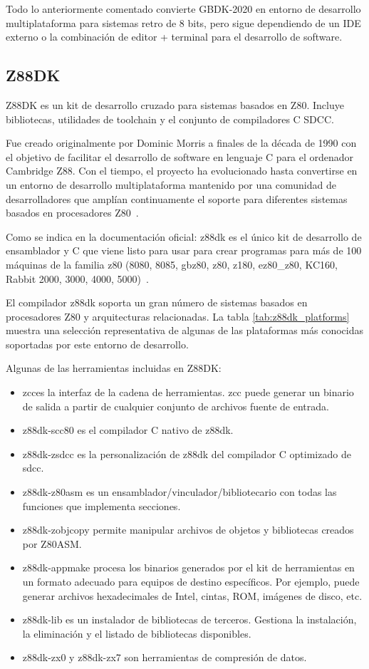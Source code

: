 \documentclass[../../main.tex]{subfiles}
\begin{document}
Todo lo anteriormente comentado convierte GBDK-2020 en entorno de desarrollo multiplataforma para sistemas retro de 8 bits, pero sigue dependiendo de un IDE externo o la combinación de editor + terminal para el desarrollo de software.

\clearpage
\subsection{Z88DK}
Z88DK es un kit de desarrollo cruzado para sistemas basados en Z80. Incluye bibliotecas, utilidades de toolchain y el conjunto de compiladores C SDCC.

Fue creado originalmente por Dominic Morris a finales de la década de 1990 con el objetivo de facilitar el desarrollo de software en lenguaje C para el ordenador Cambridge Z88. Con el tiempo, el proyecto ha evolucionado hasta convertirse en un entorno de desarrollo multiplataforma mantenido por una comunidad de desarrolladores que amplían continuamente el soporte para diferentes sistemas basados en procesadores Z80~\cite{z88dk}.

Como se indica en la documentación oficial: z88dk es el único kit de desarrollo de ensamblador y C que viene listo para usar para crear programas para más de 100 máquinas de la familia z80 (8080, 8085, gbz80, z80, z180, ez80\_z80, KC160, Rabbit 2000, 3000, 4000, 5000)~\cite{z88dk}.

\par{El compilador z88dk soporta un gran número de sistemas basados en procesadores Z80 y arquitecturas relacionadas. La tabla \ref{tab:z88dk_platforms} muestra una selección representativa de algunas de las plataformas más conocidas soportadas por este entorno de desarrollo.}

\par{Algunas de las herramientas incluidas en Z88DK:}
\begin{itemize}
    \item zcces la interfaz de la cadena de herramientas. zcc puede generar un binario de salida a partir de cualquier conjunto de archivos fuente de entrada.
    \item z88dk-scc80 es el compilador C nativo de z88dk.
    \item z88dk-zsdcc es la personalización de z88dk del compilador C optimizado de sdcc.
    \item z88dk-z80asm es un ensamblador/vinculador/bibliotecario con todas las funciones que implementa secciones.
    \item z88dk-zobjcopy permite manipular archivos de objetos y bibliotecas creados por Z80ASM.
    \item z88dk-appmake procesa los binarios generados por el kit de herramientas en un formato adecuado para equipos de destino específicos. Por ejemplo, puede generar archivos hexadecimales de Intel, cintas, ROM, imágenes de disco, etc.
    \item z88dk-lib es un instalador de bibliotecas de terceros. Gestiona la instalación, la eliminación y el listado de bibliotecas disponibles.
    \item z88dk-zx0 y z88dk-zx7 son herramientas de compresión de datos.
\end{itemize}
\end{document}
